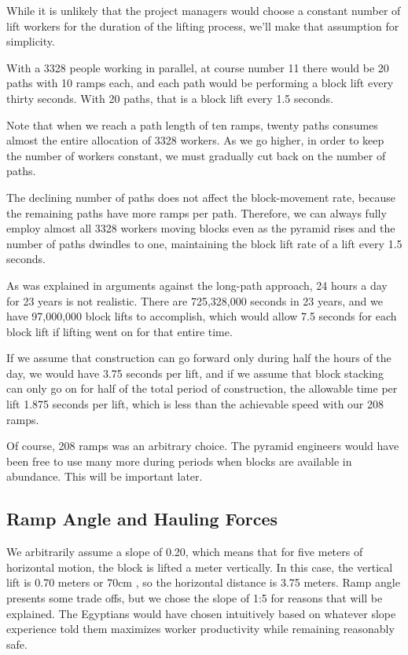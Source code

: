 \documentclass[letterpaper,11pt]{article}
\begin{document}
While it is unlikely that the project managers would choose a constant number of lift workers for the duration of the lifting process, 
we'll make that assumption for simplicity. 

With a 3328 people working in parallel, at course number 11 there would be 20 paths with 10 ramps each, and
each path would be performing a block lift every thirty seconds.  
With 20 paths, that is a block lift every 1.5 seconds.  

Note that when we reach a path length of ten ramps, twenty paths consumes almost the entire allocation of 3328 workers. 
As we go higher, in order to keep the number of workers constant, we must gradually cut back on the number of paths. 

The declining number of paths does not affect the block-movement rate, because the remaining paths have more ramps per path. 
Therefore, we can always fully employ almost all 3328 workers moving blocks even as the pyramid rises and the number of 
paths dwindles to one, maintaining the block lift rate of a lift every 1.5 seconds. 

As was explained in arguments against the long-path approach, 24 hours a day for 23 years is not realistic.
There are 725,328,000 seconds in 23 years, and we have 97,000,000 block lifts to accomplish, which would allow 7.5 seconds for each block lift 
if lifting went on for that entire time. 

If we assume that construction can go forward only during half the hours of the day, we would have 3.75 seconds per lift, and if we 
assume that block stacking can only go on for half of the total period of construction, the allowable time per lift 1.875 seconds per lift, 
which is less than the achievable speed with our 208 ramps. 

Of course, 208 ramps was an arbitrary choice. 
The pyramid engineers would have been free to use many more during periods when blocks are available in abundance.
This will be important later.

\subsection{Ramp Angle and Hauling Forces}

We arbitrarily assume a slope of 0.20,  which means that for five meters of horizontal motion, the block is lifted a meter vertically.
In this case, the vertical lift is 0.70 meters or 70cm , so the horizontal distance is 3.75 meters.  
Ramp angle presents some trade offs, but we chose the slope of 1:5 for reasons that will be explained. 
The Egyptians would have chosen intuitively based on whatever slope experience told them maximizes worker productivity while remaining reasonably safe.  
\end{document}
